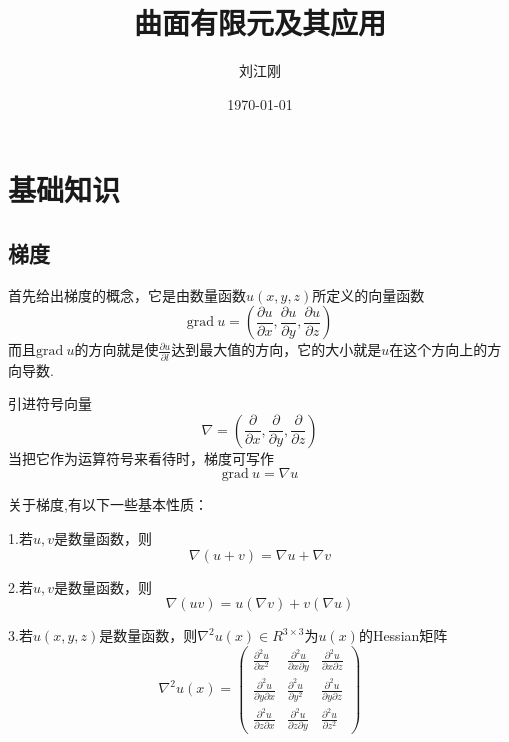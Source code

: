 \documentclass{article}
\begin{document}
\title{曲面有限元及其应用}
\author{刘江刚}
\date{\today}
\maketitle
\newpage
\section{基础知识}
\subsection{梯度}
首先给出梯度的概念，它是由数量函数$u(x,y,z)$所定义的向量函数
\begin{equation*}
\text{grad}~u=\left(\frac{\partial u}{\partial x},\frac{\partial u}{\partial y},\frac{\partial u}{\partial z}\right) 
\end{equation*}
而且$\text{grad}~u$的方向就是使$\frac{\partial u}{\partial l}$达到最大值的方向，它的大小就是$u$在这个方向上的方向导数.

引进符号向量
\begin{equation*}
\nabla=\left(\frac{\partial}{\partial x},\frac{\partial}{\partial y},\frac{\partial}{\partial z}\right)
\end{equation*}
当把它作为运算符号来看待时，梯度可写作
\begin{equation*}
\text{grad}~u=\nabla u
\end{equation*}

关于梯度,有以下一些基本性质：

1.若$u,v$是数量函数，则
\begin{equation*}
\nabla(u+v)=\nabla u+\nabla v
\end{equation*}

2.若$u,v$是数量函数，则
\begin{equation*}
\nabla(uv)=u(\nabla v)+v(\nabla u)
\end{equation*}

3.若$u(x,y,z)$是数量函数，则$\nabla^2u(x)\in R^{3\times 3}$为$u(x)$的Hessian矩阵
\begin{equation*}
\nabla^2u(x)=
\begin{pmatrix}
\frac{\partial^2u}{\partial x^2} & \frac{\partial^2u}{\partial x\partial y} & \frac{\partial^2u}{\partial x\partial z} \\
\frac{\partial^2u}{\partial y\partial x} & \frac{\partial^2u}{\partial y^2} & \frac{\partial^2u}{\partial y\partial z} \\
\frac{\partial^2u}{\partial z\partial x} & \frac{\partial^2u}{\partial z\partial y} & \frac{\partial^2u}{\partial z^2} 
\end{pmatrix}
\end{equation*}
\end{document}
